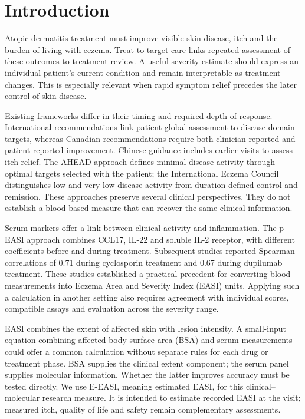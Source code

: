 \documentclass[10pt,a4paper]{article}
\begin{document}
\section{Introduction}
Atopic dermatitis treatment must improve visible skin disease, itch and the burden of living with eczema. Treat-to-target care links repeated assessment of these outcomes to treatment review.\citep{williams2022home,debruin2021t2t} A useful severity estimate should express an individual patient's current condition and remain interpretable as treatment changes. This is especially relevant when rapid symptom relief precedes the later control of skin disease.

Existing frameworks differ in their timing and required depth of response. International recommendations link patient global assessment to disease-domain targets, whereas Canadian recommendations require both clinician-reported and patient-reported improvement. Chinese guidance includes earlier visits to assess itch relief.\citep{debruin2021t2t,yeung2023t2t,zhao2022chinat2t,zhao2026t2t} The AHEAD approach defines minimal disease activity through optimal targets selected with the patient; the International Eczema Council distinguishes low and very low disease activity from duration-defined control and remission.\citep{silverberg2024ahead,merola2026iec} These approaches preserve several clinical perspectives. They do not establish a blood-based measure that can recover the same clinical information.

Serum markers offer a link between clinical activity and inflammation. The p-EASI approach combines CCL17, IL-22 and soluble IL-2 receptor, with different coefficients before and during treatment.\citep{thijs2017} Subsequent studies reported Spearman correlations of 0.71 during cyclosporin treatment and 0.67 during dupilumab treatment.\citep{thijs2019,bakker2020} These studies established a practical precedent for converting blood measurements into Eczema Area and Severity Index (EASI) units. Applying such a calculation in another setting also requires agreement with individual scores, compatible assays and evaluation across the severity range.\citep{luijken2020,riley2024validation}

EASI combines the extent of affected skin with lesion intensity.\citep{hanifin2022,home_easi} A small-input equation combining affected body surface area (BSA) and serum measurements could offer a common calculation without separate rules for each drug or treatment phase. BSA supplies the clinical extent component; the serum panel supplies molecular information. Whether the latter improves accuracy must be tested directly. We use E-EASI, meaning estimated EASI, for this clinical--molecular research measure. It is intended to estimate recorded EASI at the visit; measured itch, quality of life and safety remain complementary assessments.
\end{document}
